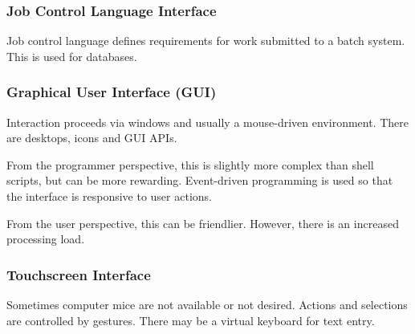 \subsubsection{Job Control Language Interface}

Job control language defines requirements for work submitted to a batch system.
This is used for databases.

\subsubsection{Graphical User Interface (GUI)}

Interaction proceeds via windows and usually a mouse-driven environment.
There are desktops, icons and GUI APIs.

From the programmer perspective, this is slightly more complex than shell scripts, but can be more rewarding.
Event-driven programming is used so that the interface is responsive to user actions.

From the user perspective, this can be friendlier.
However, there is an increased processing load.

\subsubsection{Touchscreen Interface}

Sometimes computer mice are not available or not desired.
Actions and selections are controlled by gestures.
There may be a virtual keyboard for text entry.
